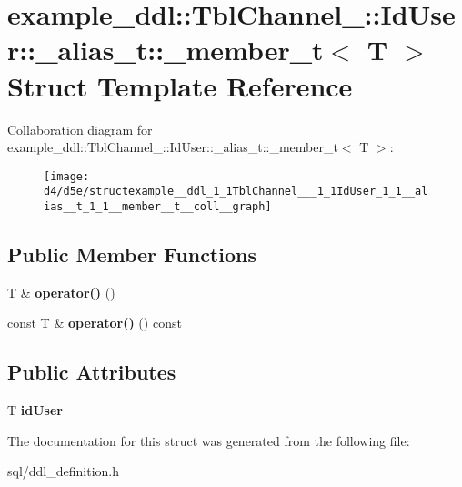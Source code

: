 \hypertarget{structexample__ddl_1_1TblChannel___1_1IdUser_1_1__alias__t_1_1__member__t}{}\section{example\+\_\+ddl\+:\+:Tbl\+Channel\+\_\+\+:\+:Id\+User\+:\+:\+\_\+alias\+\_\+t\+:\+:\+\_\+member\+\_\+t$<$ T $>$ Struct Template Reference}
\label{structexample__ddl_1_1TblChannel___1_1IdUser_1_1__alias__t_1_1__member__t}


Collaboration diagram for example\+\_\+ddl\+:\+:Tbl\+Channel\+\_\+\+:\+:Id\+User\+:\+:\+\_\+alias\+\_\+t\+:\+:\+\_\+member\+\_\+t$<$ T $>$\+:
\nopagebreak
\begin{figure}[H]
\begin{center}
\leavevmode
\texttt{[image: d4/d5e/structexample\_\_ddl\_1\_1TblChannel\_\_\_1\_1IdUser\_1\_1\_\_alias\_\_t\_1\_1\_\_member\_\_t\_\_coll\_\_graph]}
\end{center}
\end{figure}
\subsection*{Public Member Functions}
\begin{DoxyCompactItemize}
\item 
\hypertarget{structexample__ddl_1_1TblChannel___1_1IdUser_1_1__alias__t_1_1__member__t_a30847bda8645954eb34217d4ac15225e}{}T \& {\bfseries operator()} ()\label{structexample__ddl_1_1TblChannel___1_1IdUser_1_1__alias__t_1_1__member__t_a30847bda8645954eb34217d4ac15225e}

\item 
\hypertarget{structexample__ddl_1_1TblChannel___1_1IdUser_1_1__alias__t_1_1__member__t_ab57d7f7fe84771a149a9b6faf0f614bb}{}const T \& {\bfseries operator()} () const \label{structexample__ddl_1_1TblChannel___1_1IdUser_1_1__alias__t_1_1__member__t_ab57d7f7fe84771a149a9b6faf0f614bb}

\end{DoxyCompactItemize}
\subsection*{Public Attributes}
\begin{DoxyCompactItemize}
\item 
\hypertarget{structexample__ddl_1_1TblChannel___1_1IdUser_1_1__alias__t_1_1__member__t_a86f6351583ae180855efc205af26e0a9}{}T {\bfseries id\+User}\label{structexample__ddl_1_1TblChannel___1_1IdUser_1_1__alias__t_1_1__member__t_a86f6351583ae180855efc205af26e0a9}

\end{DoxyCompactItemize}


The documentation for this struct was generated from the following file\+:\begin{DoxyCompactItemize}
\item 
sql/ddl\+\_\+definition.\+h\end{DoxyCompactItemize}
